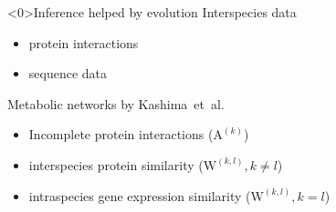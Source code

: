 \begin{frame}<0>{Inference helped by evolution}
\label{sec:evolution}
Interspecies data
\begin{itemize}
    \item protein interactions
    \item sequence data~\cite{KEGG}
\end{itemize}
Metabolic networks by Kashima~et~al.~\cite{Kashima2009}
\begin{itemize}
    \item Incomplete protein interactions ($\text{A}^{(k)}$)
    \item interspecies protein similarity ($\text{W}^{(k,l)}, k \ne l$)
    \item intraspecies gene expression similarity ($\text{W}^{(k,l)}, k = l$)
\end{itemize}

\end{frame}
